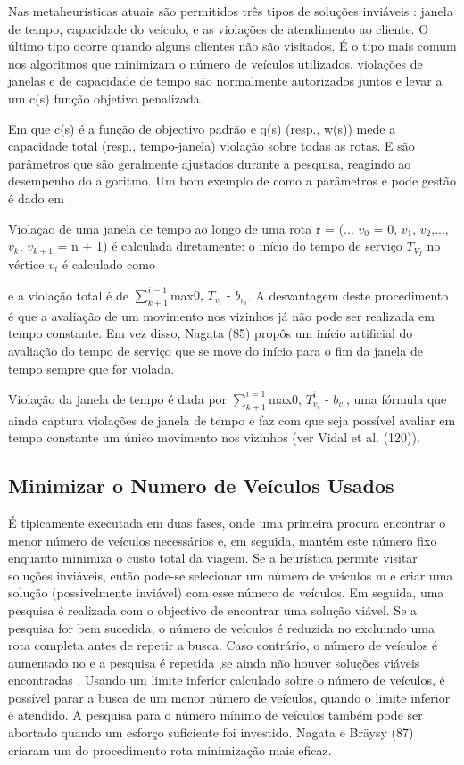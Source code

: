  

Nas metaheurísticas atuais são permitidos três tipos de soluções inviáveis : janela de tempo, capacidade do veículo, e as violações de atendimento ao cliente. O último tipo ocorre quando alguns clientes não são visitados. É o tipo mais comum nos algoritmos que minimizam o número de veículos utilizados. violações de janelas e de capacidade de tempo são normalmente autorizados juntos e levar a um c(s) função objetivo penalizada.

Em que c(s) é a função de objectivo padrão e q(s) (resp., w(s)) mede a capacidade total (resp., tempo-janela) violação sobre todas as rotas. E são parâmetros que são geralmente ajustados durante a pesquisa, reagindo ao desempenho do algoritmo. Um bom exemplo de como a parâmetros e pode gestão é dado em \cite{cordeau01}.


Violação de uma janela de tempo ao longo de uma rota r = (... $v_0$ = 0, $v_1$, $v_2$,..., $v_k$, $v_{k + 1}$ = n + 1) é calculada diretamente: o início do tempo de serviço $T_{V_{I}}$ no vértice $v_i$ é calculado como 


e a violação total é de $ \sum_{k + 1}^{i = 1}$max{0, $T_{v_{i}}$ - $b_{v_{i}}$}. A desvantagem deste procedimento é que a avaliação de um movimento nos vizinhos já não pode ser realizada em tempo constante. Em vez disso, Nagata (85) propôs um início artificial do avaliação do tempo de serviço que se move do início para o fim da janela de tempo sempre que for violada.



Violação da janela de tempo é dada por $ \sum_{k + 1}^{i = 1}$max{0, $T_{v_{i}}^i$ - $b_{v_{i}}$}, uma fórmula que ainda captura violações de janela de tempo e faz com que seja possível avaliar em tempo constante um único movimento nos vizinhos (ver Vidal et al. (120)).


\subsection{Minimizar o Numero de Veículos Usados }

É tipicamente executada em duas fases, onde uma primeira procura encontrar o menor número de veículos necessários e, em seguida, mantém este número fixo enquanto minimiza o custo total da viagem. Se a heurística permite visitar soluções inviáveis, então pode-se selecionar um número de veículos m e criar uma solução (possivelmente inviável) com esse número de veículos. Em seguida, uma pesquisa é realizada com o objectivo de encontrar uma solução viável. Se a pesquisa for bem sucedida, o número de veículos é reduzida no excluindo uma rota completa antes de repetir a busca. Caso contrário, o número de veículos é aumentado no e a pesquisa é repetida ,se ainda não houver soluções viáveis encontradas . Usando um limite inferior calculado sobre o número de veículos, é possível parar a busca de um menor número de veículos, quando o limite inferior é atendido. A pesquisa para o número mínimo de veículos também pode ser abortado quando um esforço suficiente foi investido. Nagata e Bräysy (87) criaram um do procedimento rota minimização mais eficaz.


